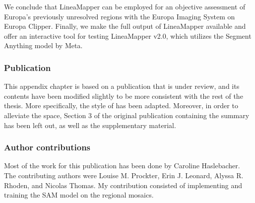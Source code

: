 We conclude that LineaMapper can be employed for an objective assessment of Europa's previously unresolved regions with the Europa Imaging System on Europa Clipper. Finally, we make the full output of LineaMapper available and offer an interactive tool for testing LineaMapper v2.0, which utilizes the Segment Anything model by Meta.

\subsubsection{Publication}This appendix chapter is based on a publication that is under review, and its contents have been modified slightly to be more consistent with the rest of the thesis. More specifically, the style of  has been adapted. Moreover, in order to alleviate the space, Section 3 of the original publication containing the summary has been left out, as well as the supplementary material.

\subsubsection{Author contributions}Most of the work for this publication has been done by Caroline Haslebacher. The contributing authors were Louise M. Prockter, Erin J. Leonard, Alyssa R. Rhoden, and Nicolas Thomas. My contribution consisted of implementing and training the SAM model on the regional mosaics.




% 

